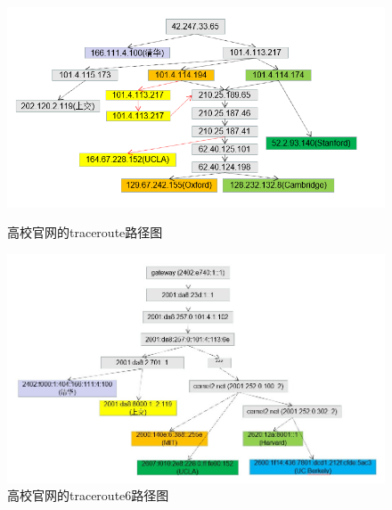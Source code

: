 \documentclass[12pt,letterpaper]{article}
\begin{document}
\begin{figure}[!h]
	\centering
	\begin{minipage}{\textwidth}
		\centering
		\includegraphics[width=\textwidth]{traceroute}
		\caption{\label{res1}高校官网的traceroute路径图}
	\end{minipage}
	\begin{minipage}{\textwidth}
		\centering
		\includegraphics[width=\textwidth]{traceroute6}
		\caption{\label{res2}高校官网的traceroute6路径图}
	\end{minipage}
\end{figure}
\end{document}
